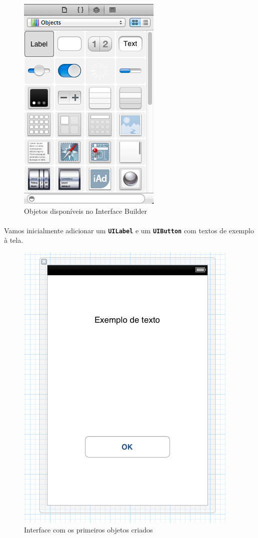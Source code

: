 \documentclass[a4paper,12pt,brazil,doubleside]{book}
\begin{document}
\begin{figure}[h]
  \centering
  \includegraphics[totalheight=0.25\textheight]{../figuras/ios/1/xib_objetos.png}
  \caption{Objetos disponíveis no Interface Builder}
  \label{fig:a}
\end{figure}

\bigskip

\paragraph{}Vamos inicialmente adicionar um \texttt{\textbf{UILabel}} e um \texttt{\textbf{UIButton}} com textos de exemplo à tela.

\begin{figure}[h]
  \centering
  \includegraphics[totalheight=0.4\textheight]{../figuras/ios/1/xib_tela1.png}
  \caption{Interface com os primeiros objetos criados}
  \label{fig:a}
\end{figure}
\end{document}
